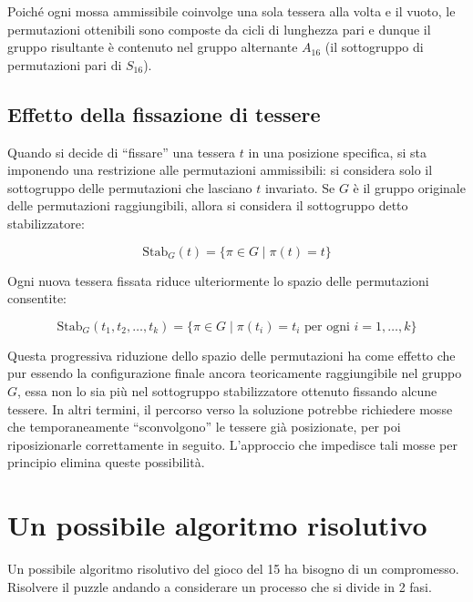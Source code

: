 Poiché ogni mossa ammissibile coinvolge una sola tessera alla volta e il vuoto, le permutazioni ottenibili sono composte da cicli di lunghezza pari e dunque il gruppo risultante è contenuto nel gruppo alternante $A_{16}$ (il sottogruppo di permutazioni pari di $S_{16}$).

\subsection{Effetto della fissazione di tessere}
Quando si decide di ``fissare'' una tessera $t$ in una posizione specifica, si sta imponendo una restrizione alle permutazioni ammissibili: si considera solo il sottogruppo delle permutazioni che lasciano $t$ invariato. Se $G$ è il gruppo originale delle permutazioni raggiungibili, allora si considera il sottogruppo detto stabilizzatore:

\[
\text{Stab}_G(t) = \{ \pi \in G \mid \pi(t) = t \}
\]

Ogni nuova tessera fissata riduce ulteriormente lo spazio delle permutazioni consentite:

\[
\text{Stab}_G(t_1, t_2, \dots, t_k) = \{ \pi \in G \mid \pi(t_i) = t_i \text{ per ogni } i = 1, \dots, k \}
\]

Questa progressiva riduzione dello spazio delle permutazioni ha come effetto che pur essendo la configurazione finale ancora teoricamente raggiungibile nel gruppo $G$, essa non lo sia più nel sottogruppo stabilizzatore ottenuto fissando alcune tessere. In altri termini, il percorso verso la soluzione potrebbe richiedere mosse che temporaneamente ``sconvolgono'' le tessere già posizionate, per poi riposizionarle correttamente in seguito. L’approccio che impedisce tali mosse per principio elimina queste possibilità.

\section{Un possibile algoritmo risolutivo ~\cite{8}} 
Un possibile algoritmo risolutivo del gioco del 15 ha bisogno di un compromesso.
Risolvere il puzzle andando a considerare un processo che si divide in 2 fasi.

